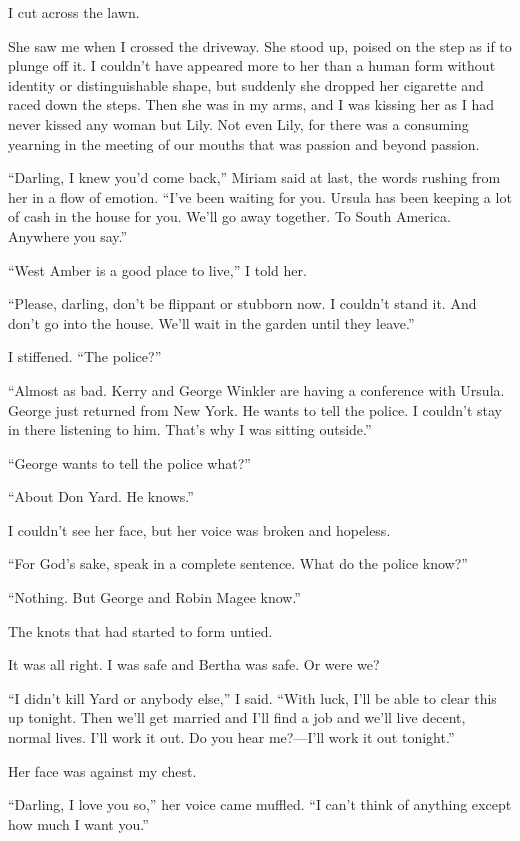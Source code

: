 \documentclass{novel}
\begin{document}
I cut across the lawn.

She saw me when I crossed the driveway. She stood up, poised on the step as if to plunge off it. I couldn’t have appeared more to her than a human form without identity or distinguishable shape, but suddenly she dropped her cigarette and raced down the steps. Then she was in my arms, and I was kissing her as I had never kissed any woman but Lily. Not even Lily, for there was a consuming yearning in the meeting of our mouths that was passion and beyond passion.

“Darling, I knew you’d come back,” Miriam said at last, the words rushing from her in a flow of emotion. “I’ve been waiting for you. Ursula has been keeping a lot of cash in the house for you. We’ll go away together. To South America. Anywhere you say.”

“West Amber is a good place to live,” I told her.

“Please, darling, don’t be flippant or stubborn now. I couldn’t stand it. And don’t go into the house. We’ll wait in the garden until they leave.”

I stiffened. “The police?”

“Almost as bad. Kerry and George Winkler are having a conference with Ursula. George just returned from New York. He wants to tell the police. I couldn’t stay in there listening to him. That’s why I was sitting outside.”

“George wants to tell the police what?”

“About Don Yard. He knows.”

\scenestars

I couldn’t see her face, but her voice was broken and \mbox{hopeless}.

“For God’s sake, speak in a complete sentence. What do the police know?”

“Nothing. But George and Robin Magee know.”

The knots that had started to form untied. 

It was all right. I was safe and Bertha was safe. Or were we?

“I didn’t kill Yard or anybody else,” I said. “With luck, I’ll be able to clear this up tonight. Then we’ll get married and I’ll find a job and we’ll live decent, normal lives. I’ll work it out. Do you hear me?—I’ll work it out tonight.”

Her face was against my chest. 

“Darling, I love you so,” her voice came muffled. “I can’t think of anything except how much I want you.”
\end{document}
